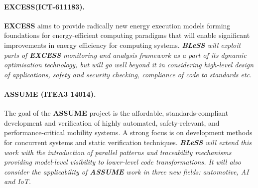 \documentclass[a4paper,11pt]{article}
\newcommand{\project}[1]{\textbf{#1}\xspace}
\newcommand{\BLESS}{\project{BLeSS}}
\newcommand{\TheProject}{\BLESS}
\begin{document}

\newcommand{\EXCESS}{\project{EXCESS}}
\vspace{-2pt}
\paragraph{\EXCESS (ICT-611183).}

\EXCESS aims to provide radically new energy execution models forming foundations for energy-efficient computing paradigms that will enable significant improvements in energy efficiency for computing systems.
%
\emph{\TheProject{} will exploit parts of \EXCESS monitoring and analysis framework as a part of its
dynamic optimisation technology, but will go well beyond it in considering high-level design
of applications, safety and security checking, compliance of code to standards etc.}

\vspace{-2pt}
\paragraph{\project{ASSUME} (ITEA3 14014).}

The goal of the \project{ASSUME} project is the affordable, standards-compliant
development and verification of highly automated, safety-relevant, and
performance-critical mobility systems. A strong focus is on
development methods for concurrent systems and static verification
techniques.
%
\emph{\TheProject{} will extend this work with the introduction of
  parallel patterns and 
  traceability mechanisms providing model-level visibility to
  lower-level code transformations.  It will also  consider the
  applicability of \project{ASSUME} work in three new fields: automotive, AI and IoT.}

\vspace{-2pt}
\end{document}
